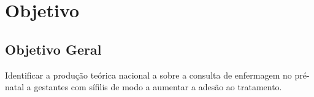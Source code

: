 \chapter{Objetivo}
\label{sec:objetivos}

\section{Objetivo Geral}
\label{sec:objetivo-geral}

Identificar a produção teórica nacional a sobre a consulta de enfermagem no pré-natal a gestantes com sífilis de modo a aumentar a adesão ao tratamento.


